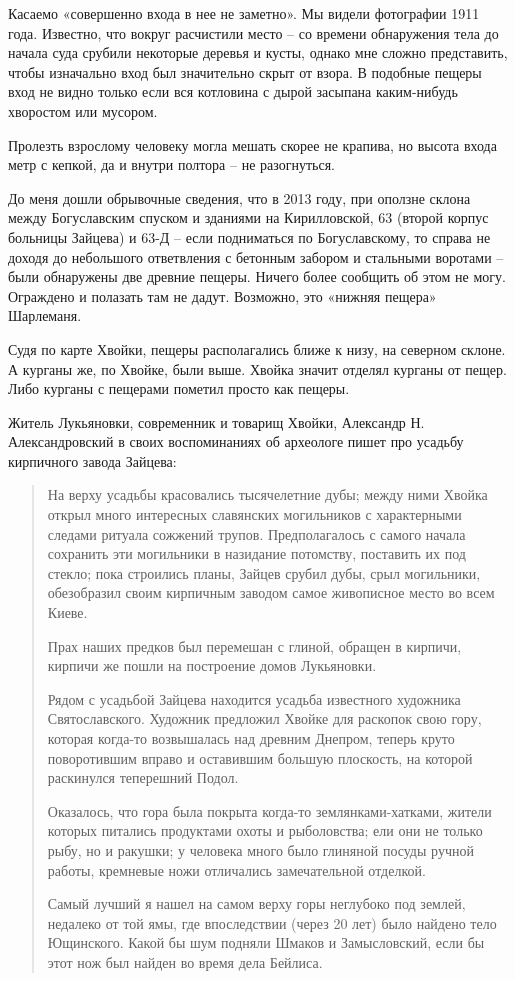 Касаемо «совершенно входа в нее не заметно». Мы видели фотографии 1911 года. Известно, что вокруг расчистили место – со времени обнаружения тела до начала суда срубили некоторые деревья и кусты, однако мне сложно представить, чтобы изначально вход был значительно скрыт от взора. В подобные пещеры вход не видно только если вся котловина с дырой засыпана каким-нибудь хворостом или мусором.

Пролезть взрослому человеку могла мешать скорее не крапива, но высота входа метр с кепкой, да и внутри полтора – не разогнуться.

До меня дошли обрывочные сведения, что в 2013 году, при оползне склона между Богуславским спуском и зданиями на Кирилловской, 63 (второй корпус больницы Зайцева) и 63-Д – если подниматься по Богуславскому, то справа не доходя до небольшого ответвления с бетонным забором и стальными воротами – были обнаружены две древние пещеры. Ничего более сообщить об этом не могу. Ограждено и полазать там не дадут. Возможно, это «нижняя пещера» Шарлеманя.

Судя по карте Хвойки, пещеры располагались ближе к низу, на северном склоне. А курганы же, по Хвойке, были выше. Хвойка значит отделял курганы от пещер. Либо курганы с пещерами пометил просто как пещеры.

Житель Лукьяновки, современник и товарищ Хвойки, Александр Н. Александровский в своих воспоминаниях об археологе пишет про усадьбу кирпичного завода Зайцева:

\begin{quotation}
На верху усадьбы красовались тысячелетние дубы; между ними Хвойка открыл много интересных славянских могильников с характерными следами ритуала сожжений трупов. Предполагалось с самого начала сохранить эти могильники в назидание потомству, поставить их под стекло; пока строились планы, Зайцев срубил дубы, срыл могильники, обезобразил своим кирпичным заводом самое живописное место во всем Киеве.

Прах наших предков был перемешан с глиной, обращен в кирпичи, кирпичи же пошли на построение домов Лукьяновки. 

Рядом с усадьбой Зайцева находится усадьба известного художника Святославского. Художник предложил Хвойке для раскопок свою гору, которая когда-то возвышалась над древ\-ним Днепром, теперь круто поворотившим вправо и оставившим большую плоскость, на которой раскинулся теперешний Подол. 

Оказалось, что гора была покрыта когда-то землянка\-ми-хатками, жители которых питались продуктами охоты и рыболовства; ели они не только рыбу, но и ракушки; у человека много было глиняной посуды ручной работы, кремневые ножи отличались замечательной отделкой. 

Самый лучший я нашел на самом верху горы неглубоко под землей, недалеко от той ямы, где впоследствии (через 20 лет) было найдено тело Ющинского. Какой бы шум подняли Шмаков и Замысловский, если бы этот нож был найден во время дела Бейлиса.
\end{quotation}

